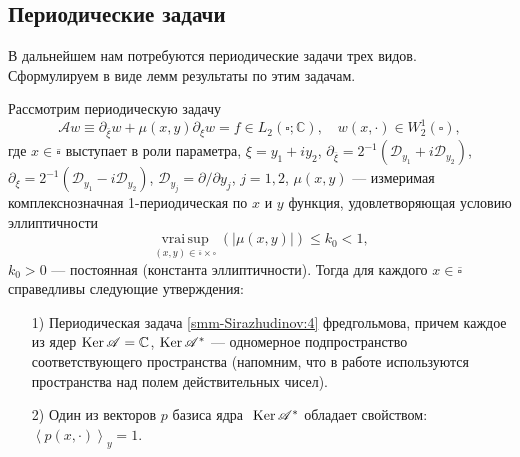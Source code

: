 \subsection{Периодические задачи}
В дальнейшем нам потребуются периодические задачи трех видов. Сформулируем в виде   лемм  результаты по этим задачам.
\begin{lemma}
	Рассмотрим периодическую задачу
	\begin{equation}\label{smm-Sirazhudinov:4}
		\mathscr{A}w\equiv\partial_{\bar{\xi}}w+\mu(x,y)\partial_\xi w=f\in L_2 (\square;\mathbb{C}),\quad w(x,\cdot)
		\in W_2^1 (\square),
	\end{equation}
	где $x\in \overline{\square}$ выступает в роли параметра, $\xi=y_1+iy_2$,
	$\partial_{\bar{\xi}}=2^{-1}(\mathscr{D}_{y_1}+i\mathscr{D}_{y_2})$,
	$\partial_\xi=2^{-1}(\mathscr{D}_{y_1}-i\mathscr{D}_{y_2})$,
	$\mathscr{D}_{y_j}=\partial/\partial y_j$, $j=1,2$,
	$\mu(x,y)$ --- измеримая комплекснозначная 1-периодическая по $x$ и $y$ функция, удовлетворяющая условию эллиптичности
	\begin{equation}\label{smm-Sirazhudinov:5}
		\mathop{\mathrm{vrai\, sup}}\limits_{(x,y)\in\overline\square\times\square} (|\mu(x,y)|)     \leqslant k_0<1,
	\end{equation}
	$k_0>0$ --- постоянная (константа эллиптичности).
	Тогда для  каждого $x\in \overline\square$ справедливы следующие утверждения:
	\begin{enumerate}
		\item[1)]       Периодическая задача \eqref{smm-Sirazhudinov:4} фредгольмова, причем каждое из ядер $\text{Ker\,}\mathscr{A}=\mathbb{C}$, $\text{Ker\,}\mathscr{A}^\ast$ --- одномерное подпространство соответствующего пространства (напомним,
		что в работе используются пространства над полем действительных чисел).
		\item[2)] Один из векторов $p$ базиса ядра $\text{ Ker\,}\mathscr{A}^\ast$ обладает свойством: $\left\langle p(x,\cdot)\right\rangle_y=1$.
	\end{enumerate}
\end{lemma}
